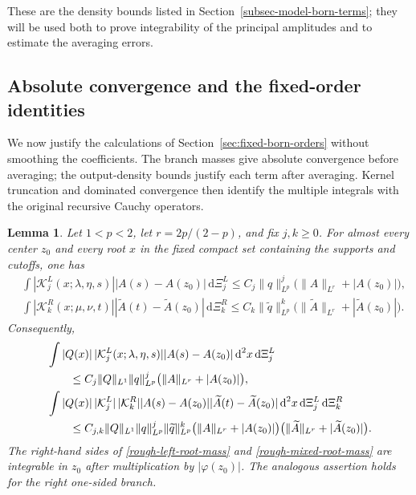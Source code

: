 \documentclass[a4paper,11pt]{article}
\newcommand{\dd}{\,\text{d}}
\theoremstyle{plain}
\newtheorem{lem}[thm]{Lemma}
\theoremstyle{definition}
\theoremstyle{remark}
\begin{document}
These are the density bounds listed in Section~\ref{subsec-model-born-terms}; they will be used both to prove integrability of the principal amplitudes and to estimate the averaging errors.

\subsection{Absolute convergence and the fixed-order identities}
\label{subsubsec-direct-rough-identities}

We now justify the calculations of Section~\ref{sec:fixed-born-orders} without smoothing the coefficients. The branch masses give absolute convergence before averaging; the output-density bounds justify each term after averaging. Kernel truncation and dominated convergence then identify the multiple integrals with the original recursive Cauchy operators.

\begin{lem}
\label{lem-fixed-order-absolute-convergence}
Let $1<p<2$, let $r=2p/(2-p)$, and fix $j,k\ge0$.  For almost every center
$z_0$ and every root $x$ in the fixed compact set containing the supports and
cutoffs, one has
\begin{align}
&\int |\mathcal K_j^L(x;\lambda,\eta,s)|
       |A(s)-A(z_0)|\dd\Xi_j^L
 \le C_j\|q\|_{L^p}^j
       \bigl(\|A\|_{L^r}+|A(z_0)|\bigr),
\label{rough-left-branch-mass}\\
&\int |\mathcal K_k^R(x;\mu,\nu,t)|
       |\widetilde A(t)-\widetilde A(z_0)|\dd\Xi_k^R
 \le C_k\|\widetilde q\|_{L^p}^k
       \bigl(\|\widetilde A\|_{L^r}
             +|\widetilde A(z_0)|\bigr).
\label{rough-right-branch-mass}
\end{align}
Consequently,
\begin{align}
&\int |Q(x)|\,|\mathcal K_j^L(x;\lambda,\eta,s)|
       |A(s)-A(z_0)|\dd^2x\dd\Xi_j^L
\notag\\
&\qquad\le C_j\|Q\|_{L^1}\|q\|_{L^p}^j
       \bigl(\|A\|_{L^r}+|A(z_0)|\bigr),
\label{rough-left-root-mass}\\
&\int |Q(x)|\,|\mathcal K_j^L|\,|\mathcal K_k^R|
       |A(s)-A(z_0)|
       |\widetilde A(t)-\widetilde A(z_0)|
       \dd^2x\dd\Xi_j^L\dd\Xi_k^R
\notag\\
&\qquad\le C_{j,k}\|Q\|_{L^1}
       \|q\|_{L^p}^j\|\widetilde q\|_{L^p}^k
       \bigl(\|A\|_{L^r}+|A(z_0)|\bigr)
       \bigl(\|\widetilde A\|_{L^r}
             +|\widetilde A(z_0)|\bigr).
\label{rough-mixed-root-mass}
\end{align}
The right-hand sides of \eqref{rough-left-root-mass} and
\eqref{rough-mixed-root-mass} are integrable in $z_0$ after multiplication
by $|\varphi(z_0)|$.  The analogous assertion holds for the right one-sided
branch.
\end{lem}
\end{document}
